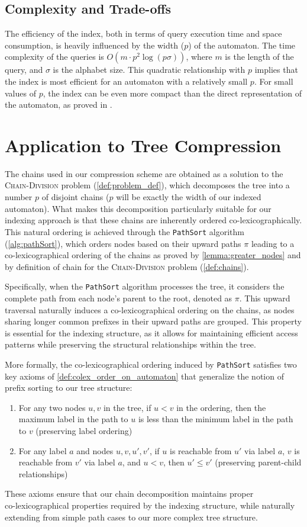 \subsection{Complexity and Trade-offs} 
The efficiency of the index, both in terms of query execution time and space consumption, is heavily influenced by the width ($p$) of the automaton. The time complexity of the queries is $O(m \cdot p^2 \log(p\sigma))$, where $m$ is the length of the query, and $\sigma$ is the alphabet size. This quadratic relationship with $p$ implies that the index is most efficient for an automaton with a relatively small $p$. For small values of $p$, the index can be even more compact than the direct representation of the automaton, as proved in \cite{maso2023indexing}.

\section{Application to Tree Compression}
The chains used in our compression scheme are obtained as a solution to the \textsc{Chain-Division} problem (\cref{def:problem_def}), which decomposes the tree into a number $p$ of disjoint chains ($p$ will be exactly the width of our indexed automaton). What makes this decomposition particularly suitable for our indexing approach is that these chains are inherently ordered co-lexicographically. This natural ordering is achieved through the \texttt{PathSort} algorithm (\cref{alg:pathSort}), which orders nodes based on their upward paths $\pi$ leading to a co-lexicographical ordering of the chains as proved by \cref{lemma:greater_nodes} and by definition of chain for the \textsc{Chain-Division} problem (\cref{def:chains}).

Specifically, when the \texttt{PathSort} algorithm processes the tree, it considers the complete path from each node's parent to the root, denoted as $\pi$. This upward traversal naturally induces a co-lexicographical ordering on the chains, as nodes sharing longer common prefixes in their upward paths are grouped. This property is essential for the indexing structure, as it allows for maintaining efficient access patterns while preserving the structural relationships within the tree.

More formally, the co-lexicographical ordering induced by \texttt{PathSort} satisfies two key axioms of \cref{def:colex_order_on_automaton} that generalize the notion of prefix sorting to our tree structure:

\begin{enumerate}
    \item For any two nodes $u,v$ in the tree, if $u < v$ in the ordering, then the maximum label in the path to $u$ is less than the minimum label in the path to $v$ (preserving label ordering)
    \item For any label $a$ and nodes $u,v,u',v'$, if $u$ is reachable from $u'$ via label $a$, $v$ is reachable from $v'$ via label $a$, and $u < v$, then $u' \leq v'$ (preserving parent-child relationships)
\end{enumerate}

These axioms ensure that our chain decomposition maintains proper\\ co-lexicographical properties required by the indexing structure, while naturally extending from simple path cases to our more complex tree structure.


